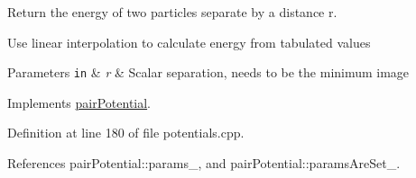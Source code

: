 Return the energy of two particles separate by a distance r. 

Use linear interpolation to calculate energy from tabulated values


\begin{DoxyParams}[1]{Parameters}
\mbox{\tt in}  & {\em r} & Scalar separation, needs to be the minimum image \\
\hline
\end{DoxyParams}


Implements \hyperlink{classpair_potential_a43dc9c840e25dc76e76d6ad7947c165d}{pair\+Potential}.



Definition at line 180 of file potentials.\+cpp.



References pair\+Potential\+::params\+\_\+, and pair\+Potential\+::params\+Are\+Set\+\_\+.


